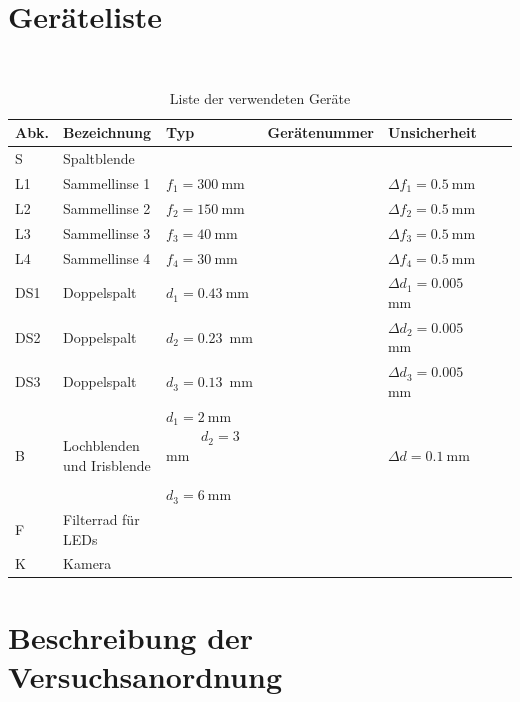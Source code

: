 \documentclass{article}
\begin{document}





\section{Geräteliste}

\begin{table}[H]
\caption{Liste der verwendeten Geräte}

~

\begin{tabular}{l|p{3cm}p{3cm}llll}
Abk. & Bezeichnung  & Typ & Gerätenummer & Unsicherheit \\
\hline
S & Spaltblende \\
\hline
L1 & Sammellinse 1 & $f_1 = 300~$mm & & $\Delta f_1 = 0.5~$mm \\
\hline
L2 & Sammellinse 2 & $f_2 = 150~$mm & & $\Delta f_2 = 0.5~$mm \\
\hline
L3 & Sammellinse 3 & $f_3 = 40~$mm & & $\Delta f_3 = 0.5~$mm \\
\hline
L4 & Sammellinse 4 & $f_4 = 30~$mm & & $\Delta f_4 = 0.5~$mm \\
\hline
DS1 & Doppelspalt & $d_1=0.43~$mm  & & $\Delta d_1 = 0.005~$mm \\
\hline
DS2 & Doppelspalt & $d_2=0.23$~mm  & & $\Delta d_2 = 0.005~$mm\\
\hline
DS3 & Doppelspalt & $d_3=0.13$~mm & & $\Delta d_3 = 0.005~$mm\\
\hline





B & Lochblenden und Irisblende & $d_1=2~$mm ~ ~ ~ ~ $d_2=3~$mm   ~~~~~~~~~~~~ $d_3=6~$mm & &  $\Delta d = 0.1~$mm \\
\hline
F & Filterrad für LEDs & \\
\hline
K & Kamera
\end{tabular}

\end{table}


\newpage

\section{Beschreibung der Versuchsanordnung}
\end{document}
